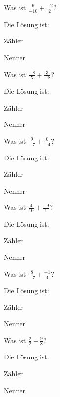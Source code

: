 \documentclass{ximera}
\begin{document}
\begin{shuffle}
\begin{question}
Was ist $\frac{6}{-10} + \frac{-2}{2}$?
\begin{solution}
Die Lösung ist:

Zähler 

Nenner 
\end{solution}
\end{question}


\begin{question}
Was ist $\frac{-8}{5} + \frac{3}{-8}$?
\begin{solution}
Die Lösung ist:

Zähler 

Nenner 
\end{solution}
\end{question}


\begin{question}
Was ist $\frac{9}{-7} + \frac{0}{-4}$?
\begin{solution}
Die Lösung ist:

Zähler 

Nenner 
\end{solution}
\end{question}


\begin{question}
Was ist $\frac{4}{10} + \frac{-9}{1}$?
\begin{solution}
Die Lösung ist:

Zähler 

Nenner 
\end{solution}
\end{question}


\begin{question}
Was ist $\frac{8}{-7} + \frac{-1}{4}$?
\begin{solution}
Die Lösung ist:

Zähler 

Nenner 
\end{solution}
\end{question}


\begin{question}
Was ist $\frac{2}{2} + \frac{9}{8}$?
\begin{solution}
Die Lösung ist:

Zähler 

Nenner 
\end{solution}
\end{question}



\end{shuffle}
\end{document}
